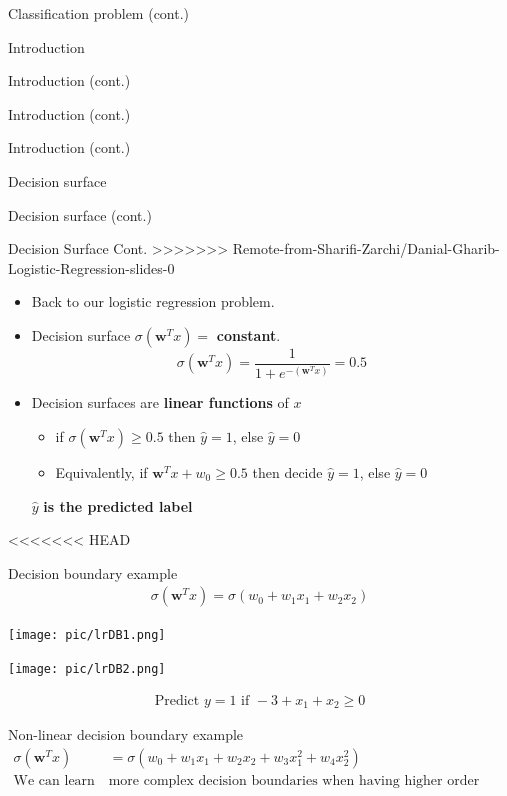 \documentclass[serif, aspectratio=169]{beamer}
\begin{document}
\begin{frame}{Classification problem (cont.)}
\begin{itemize}
\begin{frame}{Introduction}
\begin{itemize}
\begin{frame}{Introduction (cont.)}
\begin{frame}{Introduction (cont.)}
\begin{frame}{Introduction (cont.)}
\begin{frame}{Decision surface}
\begin{itemize}
\begin{frame}{Decision surface (cont.)}
\begin{frame}{Decision Surface Cont.}
>>>>>>> Remote-from-Sharifi-Zarchi/Danial-Gharib-Logistic-Regression-slides-0
    \begin{itemize}
      \item Back to our logistic regression problem.
      \item Decision surface $\sigma (\mathbf{w}^Tx) = $ \textbf{constant}.
        \[
            \sigma (\mathbf{w}^Tx) = \frac{1}{1 + e^{-(\mathbf{w}^Tx)}} = 0.5
        \]
      \item Decision surfaces are \textbf{linear functions} of $x$
        \begin{itemize}
            \item if $\sigma (\mathbf{w}^Tx) \geq 0.5$ then $\hat{y}=1$, else $\hat{y} = 0$
            \item Equivalently, if $\mathbf{w}^Tx + w_0 \geq 0.5$ then decide $\hat{y}=1$, else $\hat{y}=0$
        \end{itemize}%
        \vfill
        \begin{center}
            \( \hat{y} \) \textbf{is the predicted label}
        \end{center}
    \end{itemize}
\end{frame}

<<<<<<< HEAD
\begin{frame}{Decision boundary example}
    \begin{align*}
        \sigma (\mathbf{w}^Tx) = \sigma (w_0 + w_1 x_1 + w_2 x_2)
    \end{align*}
    
    \begin{minipage}{0.35\linewidth}
        \centering
        \texttt{[image: pic/lrDB1.png]}
    \end{minipage}
    \hfill
    \begin{minipage}{0.35\linewidth}
        \centering
        \texttt{[image: pic/lrDB2.png]}
    \end{minipage}
    
    \begin{align*}
        \text{Predict } y=1 \text{ if } -3 + x_1 + x_2 \geq 0
    \end{align*}
    
\end{frame}
\begin{frame}{Non-linear decision boundary example}
    \begin{align*}
        \sigma (\mathbf{w}^Tx) &= \sigma (w_0 + w_1 x_1 + w_2 x_2 + w_3x_1^2 + w_4x_2^2) \\
        \text{We can learn } & \text{more complex decision boundaries when having higher order terms}
    \end{align*}
    

\end{frame}
\end{frame}
\end{itemize}
\end{frame}
\end{frame}
\end{frame}
\end{frame}
\end{itemize}
\end{frame}
\end{itemize}
\end{frame}
\end{document}
